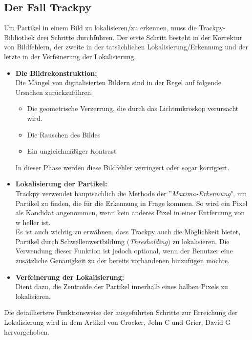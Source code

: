 \subsection{Der Fall Trackpy \label{kap0_fall_trackpy}}
Um Partikel in einem Bild zu lokalisieren/zu erkennen, muss die Trackpy-Bibliothek drei Schritte durchführen. Der erste Schritt besteht in der Korrektur von Bildfehlern, der zweite in der tatsächlichen Lokalisierung/Erkennung und der letzte in der Verfeinerung der Lokalisierung.
\begin{itemize}
\item \textbf{Die Bildrekonstruktion:}\\
Die Mängel von digitalisierten Bildern sind in der Regel auf folgende Ursachen zurückzuführen:
	\begin{itemize}
		\item Die geometrische Verzerrung, die durch das Lichtmikroskop verursacht wird.
		\item Die Rauschen des Bildes
		\item Ein ungleichmäßiger Kontrast 
	\end{itemize}
In dieser Phase werden diese Bildfehler verringert oder sogar korrigiert.

\item \textbf{Lokalisierung der Partikel:}\\
Trackpy verwendet hauptsächlich die Methode der ''\textit{Maxima-Erkennung}", um Partikel zu finden, die für die Erkennung in Frage kommen. So wird ein Pixel als Kandidat angenommen, wenn kein anderes Pixel in einer Entfernung von w heller ist. \\
Es ist auch wichtig zu erwähnen, dass Trackpy auch die Möglichkeit bietet, Partikel durch Schwellenwertbildung (\textit{Thresholding}) zu lokalisieren. Die Verwendung dieser Funktion ist jedoch optional, wenn der Benutzer eine zusätzliche Genauigkeit zu der bereits vorhandenen hinzufügen möchte.

\item \textbf{Verfeinerung der Lokalisierung:}\\
Dient dazu, die Zentroide der Partikel innerhalb eines halben Pixels zu lokalisieren.
\end{itemize}
Die detailliertere Funktionsweise der ausgeführten Schritte zur Erreichung der Lokalisierung wird in dem Artikel von Crocker, John C und Grier, David G \cite{trackpy_algorithm} hervorgehoben.
